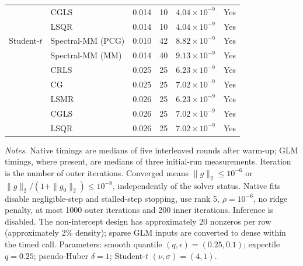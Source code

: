 \begin{longtable}{llrrrc}
 & CGLS & 0.014 & 10 & $4.04\times10^{-9}$ & Yes \\
 & LSQR & 0.014 & 10 & $4.04\times10^{-9}$ & Yes \\
\midrule
Student-$t$ & Spectral-MM (PCG) & 0.010 & 42 & $8.82\times10^{-9}$ & Yes \\
 & Spectral-MM (MM) & 0.014 & 40 & $9.13\times10^{-9}$ & Yes \\
 & CRLS & 0.025 & 25 & $6.23\times10^{-9}$ & Yes \\
 & CG & 0.025 & 25 & $7.02\times10^{-9}$ & Yes \\
 & LSMR & 0.026 & 25 & $6.23\times10^{-9}$ & Yes \\
 & CGLS & 0.026 & 25 & $7.02\times10^{-9}$ & Yes \\
 & LSQR & 0.026 & 25 & $7.02\times10^{-9}$ & Yes \\
\end{longtable}
\noindent\textit{Notes.} Native timings are medians of five interleaved rounds after warm-up; GLM timings, where present, are medians of three initial-run measurements. Iteration is the number of outer iterations. Converged means $\|g\|_2\leq10^{-6}$ or $\|g\|_2/(1+\|g_0\|_2)\leq10^{-8}$, independently of the solver status. Native fits disable negligible-step and stalled-step stopping, use rank 5, $\rho=10^{-6}$, no ridge penalty, at most 1000 outer iterations and 200 inner iterations. Inference is disabled.
The non-intercept design has approximately 20 nonzeros per row (approximately 2\% density); sparse GLM inputs are converted to dense within the timed call.
Parameters: smooth quantile $(q,\epsilon)=(0.25,0.1)$; expectile $q=0.25$; pseudo-Huber $\delta=1$; Student-$t$ $(\nu,\sigma)=(4,1)$.
\par
\endgroup
